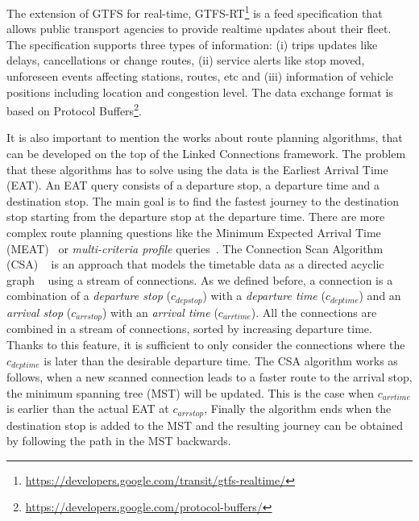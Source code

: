 \documentclass[sw]{iosart2x}
\begin{document}
The extension of GTFS for real-time, GTFS-RT\footnote{\url{https://developers.google.com/transit/gtfs-realtime/}} is a feed specification that allows public transport agencies to provide realtime updates about their fleet. The specification supports three types of information: (i) trips updates like delays, cancellations or change routes, (ii) service alerts like stop moved, unforeseen events affecting stations, routes, etc and (iii)  information of vehicle positions  including location and congestion level. The data exchange format is based on Protocol Buffers\footnote{\url{https://developers.google.com/protocol-buffers/}}.

It is also important to mention the works about route planning algorithms, that can be developed on the top of the Linked Connections framework. The problem that these algorithms has to solve using the data is the Earliest Arrival Time (EAT). An EAT query consists of a departure stop, a departure time and a destination stop. The main goal is to find the fastest journey to the destination stop starting from the departure stop at the departure time. There are more complex route planning questions like the Minimum Expected Arrival Time (MEAT)~\cite{dibbelt2013intriguingly} or \textit{multi-criteria profile} queries~\cite{bast2010fast,delling2014round,witt2015trip}. The Connection Scan Algorithm (CSA) ~\cite{dibbelt2013intriguingly} is an approach that models the timetable data as a directed acyclic graph ~\cite{strasser2014connection} using a stream of connections. As we defined before, a connection is a combination of a \textit{departure stop} ($c_{depstop}$) with a \textit{departure time} ($c_{deptime}$) and an \textit{arrival stop} ($c_{arrstop}$) with an \textit{arrival time} ($c_{arrtime}$). All the connections are combined in a stream of connections, sorted by increasing departure time. Thanks to this feature, it is sufficient to only consider the connections where the $c_{deptime}$ is later than the desirable departure time. The CSA algorithm works as follows, when a new scanned connection leads to a faster route to the arrival stop, the minimum spanning tree (MST) will be updated. This is the case when $c_{arrtime}$ is earlier than the actual EAT at $c_{arrstop}$, Finally the algorithm ends when the destination stop is added to the MST and the resulting journey can be obtained by following the path in the MST backwards.
\end{document}

